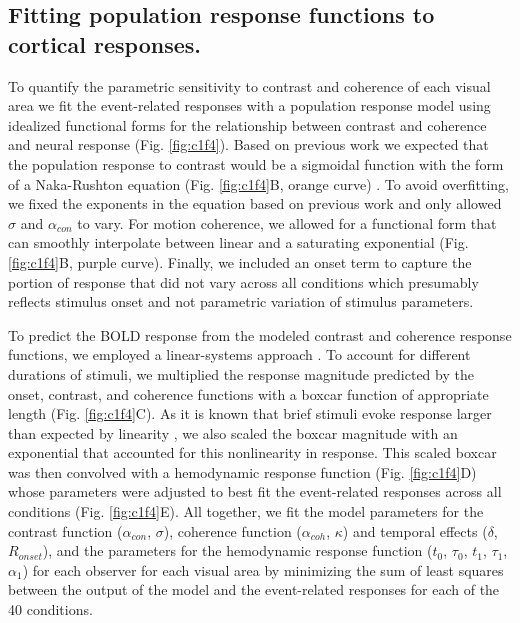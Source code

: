 \documentclass{report}
\begin{document}
\subsection{Fitting population response functions to cortical responses.}

To quantify the parametric sensitivity to contrast and coherence of each visual area we fit the event-related responses with a population response model using idealized functional forms for the relationship between contrast and coherence and neural response (Fig. \ref{fig:c1f4}). Based on previous work we expected that the population response to contrast would be a sigmoidal function \citep{Albrecht1982-rq,Sclar1990-lk,Boynton1999-jd} with the form of a Naka-Rushton equation (Fig. \ref{fig:c1f4}B, orange curve) \citep{Naka1966-fh}. To avoid overfitting, we fixed the exponents in the equation based on previous work \citep{Boynton1999-jd} and only allowed $\sigma$ and $\alpha_{con}$ to vary. For motion coherence, we allowed for a functional form that can smoothly interpolate between linear \citep{Britten1992-xy,Britten1993-oh,Simoncelli1998-ts,Rees2000-ul} and a saturating exponential (Fig. \ref{fig:c1f4}B, purple curve). Finally, we included an onset term to capture the portion of response that did not vary across all conditions which presumably reflects stimulus onset and not parametric variation of stimulus parameters.

To predict the BOLD response from the modeled contrast and coherence response functions, we employed a linear-systems approach \citep{Heeger2000-pq,Rees2000-ul,Logothetis2001-kk}. To account for different durations of stimuli, we multiplied the response magnitude predicted by the onset, contrast, and coherence functions with a boxcar function of appropriate length (Fig. \ref{fig:c1f4}C). As it is known that brief stimuli evoke response larger than expected by linearity \citep{Boynton1996-ff,Boynton2012-xy}, we also scaled the boxcar magnitude with an exponential that accounted for this nonlinearity in response. This scaled boxcar was then convolved with a hemodynamic response function (Fig. \ref{fig:c1f4}D) whose parameters were adjusted to best fit the event-related responses across all conditions (Fig. \ref{fig:c1f4}E). All together, we fit the model parameters for the contrast function ($\alpha_{con}$, $\sigma$), coherence function ($\alpha_{coh}$, $\kappa$) and temporal effects ($\delta$, $R_{onset}$), and the parameters for the hemodynamic response function ($t_0$, $\tau_0$, $t_1$, $\tau_1$, $\alpha_1$) for each observer for each visual area by minimizing the sum of least squares between the output of the model and the event-related responses for each of the 40 conditions.
\end{document}

